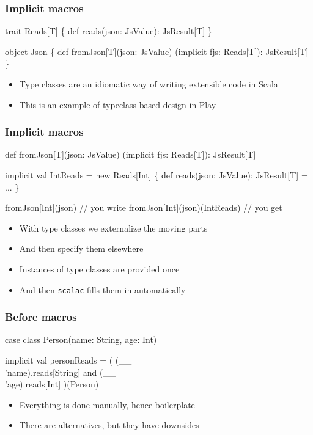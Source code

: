 \documentclass[svgnames,hyperref={bookmarks=false}]{beamer}
\begin{document}
\begin{frame}[fragile]
\frametitle{Implicit macros}

\begin{semiverbatim}
trait Reads[T] \{
  def reads(json: JsValue): JsResult[T]
\}

object Json \{
  def fromJson[T](json: JsValue)
    (implicit fjs: Reads[T]): JsResult[T]
\}

\end{semiverbatim}

\begin{itemize}
\item Type classes are an idiomatic way of writing extensible code in Scala
\item This is an example of typeclass-based design in Play
\end{itemize}
\end{frame}

\begin{frame}[fragile]
\frametitle{Implicit macros}

\begin{semiverbatim}
def fromJson[T](json: JsValue)
  (implicit fjs: Reads[T]): JsResult[T]

implicit val IntReads = new Reads[Int] \{
  def reads(json: JsValue): JsResult[T] = ...
\}

fromJson[Int](json) // you write
fromJson[Int](json)(IntReads) // you get

\end{semiverbatim}

\begin{itemize}
\item With type classes we externalize the moving parts
\item And then specify them elsewhere
\item Instances of type classes are provided once
\item And then \texttt{scalac} fills them in automatically
\end{itemize}
\end{frame}

\begin{frame}[fragile]
\frametitle{Before macros}

\begin{semiverbatim}
case class Person(name: String, age: Int)

implicit val personReads = (
  (__ \\ 'name).reads[String] and
  (__ \\ 'age).reads[Int]
)(Person)

\end{semiverbatim}

\begin{itemize}
\item Everything is done manually, hence boilerplate
\item There are alternatives, but they have downsides
\end{itemize}
\end{frame}
\end{document}
